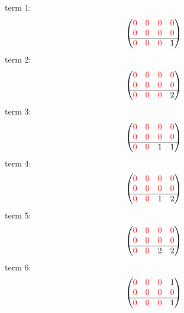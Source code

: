 \documentclass{article}
\begin{document}
 \noindent
term 1:
$$\begin{pmatrix}{\color{red} 0} & {\color{red} 0} & {\color{red} 0} & {\color{red} 0}\\
{\color{red} 0} & {\color{red} 0} & {\color{red} 0} & {\color{red} 0}\\
\hline{\color{red} 0} & {\color{red} 0} & {\color{red} 0} & 1\\
\end{pmatrix}$$
term 2:
$$\begin{pmatrix}{\color{red} 0} & {\color{red} 0} & {\color{red} 0} & {\color{red} 0}\\
{\color{red} 0} & {\color{red} 0} & {\color{red} 0} & {\color{red} 0}\\
\hline{\color{red} 0} & {\color{red} 0} & {\color{red} 0} & 2\\
\end{pmatrix}$$
term 3:
$$\begin{pmatrix}{\color{red} 0} & {\color{red} 0} & {\color{red} 0} & {\color{red} 0}\\
{\color{red} 0} & {\color{red} 0} & {\color{red} 0} & {\color{red} 0}\\
\hline{\color{red} 0} & {\color{red} 0} & 1 & 1\\
\end{pmatrix}$$
term 4:
$$\begin{pmatrix}{\color{red} 0} & {\color{red} 0} & {\color{red} 0} & {\color{red} 0}\\
{\color{red} 0} & {\color{red} 0} & {\color{red} 0} & {\color{red} 0}\\
\hline{\color{red} 0} & {\color{red} 0} & 1 & 2\\
\end{pmatrix}$$
term 5:
$$\begin{pmatrix}{\color{red} 0} & {\color{red} 0} & {\color{red} 0} & {\color{red} 0}\\
{\color{red} 0} & {\color{red} 0} & {\color{red} 0} & {\color{red} 0}\\
\hline{\color{red} 0} & {\color{red} 0} & 2 & 2\\
\end{pmatrix}$$
term 6:
$$\begin{pmatrix}{\color{red} 0} & {\color{red} 0} & {\color{red} 0} & 1\\
{\color{red} 0} & {\color{red} 0} & {\color{red} 0} & {\color{red} 0}\\
\hline{\color{red} 0} & {\color{red} 0} & {\color{red} 0} & 1\\
\end{pmatrix}$$
\end{document}
